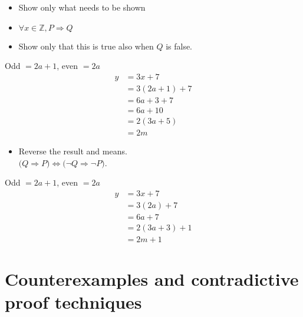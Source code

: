 \documentclass[english,10pt,a4paper]{article}
\begin{document}
\begin{theo} 
\begin{minipage}{0.7\linewidth}
\begin{itemize}
\item Show only what needs to be shown
\item $\forall x \in \mathbb{Z}, P \Rightarrow Q$
\item[] Show only that this is true also when $Q$ is false.
\end{itemize}
\end{minipage}
\hspace{0.1cm}
\begin{minipage}{0.25\linewidth}
Odd $= 2a+1$, even $=2a$
\begin{align*}
y	&=3x+7\\
	&=3(2a+1)+7\\
	&=6a+3+7\\
	&=6a+10\\
	&=2(3a+5)\\
	&=2m
\end{align*}
\end{minipage}
\end{theo}



\begin{theo}
\begin{minipage}{0.7\linewidth} 
\begin{itemize}
\item Reverse the result and means.\\
$\big(Q \Rightarrow P\big) \Leftrightarrow \big(\neg Q \Rightarrow \neg P\big)$.
\end{itemize}
\end{minipage}
\hspace{0.1cm}
\begin{minipage}{0.25\linewidth}
Odd $= 2a+1$, even $=2a$
\begin{align*}
y	&=3x+7\\
	&=3(2a)+7\\
	&=6a+7\\
	&=2(3a+3)+1\\
	&=2m+1
\end{align*}
\end{minipage}
\end{theo}



\newpage
\section{Counterexamples and contradictive proof techniques}
\end{document}

